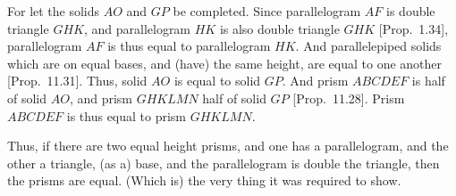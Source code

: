 \begin{Parallel}{}{}
{For let the solids $AO$ and $GP$ be completed. 
Since parallelogram $AF$ is double triangle $GHK$, and parallelogram
$HK$ is also double triangle $GHK$ [Prop.~1.34],
parallelogram $AF$ is thus equal to parallelogram $HK$. And parallelepiped
solids which are on equal bases, and (have) the same height, are equal
to one another [Prop.~11.31]. Thus, solid
$AO$ is equal to solid $GP$.  And prism $ABCDEF$ is half of solid
$AO$, and prism $GHKLMN$ half of solid $GP$ [Prop.~11.28]. Prism $ABCDEF$ is thus equal to prism $GHKLMN$.

Thus, if there are two equal height prisms,
and one has a parallelogram, and the other a triangle,  (as a) base, 
and the parallelogram is double the triangle, then the prisms are equal.
(Which is) the very thing it was required to show.}
\end{Parallel}
